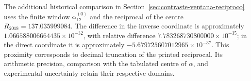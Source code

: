 The additional historical comparison in
Section~\ref{sec:contraste-ventana-reciproco} uses the finite window
\(\alpha_{12}^{(0)}\) and the reciprocal of the centre
\(R_{2018}=137.035999084\). The difference in the inverse coordinate
is approximately \(1.066588006664435\times10^{-32}\), with relative
difference \(7.783268730800000\times10^{-35}\); in the direct
coordinate it is approximately \(-5.679725607012965\times10^{-37}\).
This proximity corresponds to decimal truncation of the printed
reciprocal. Its arithmetic precision, comparison with the tabulated
centre of \(\alpha\), and experimental uncertainty retain their
respective domains.

